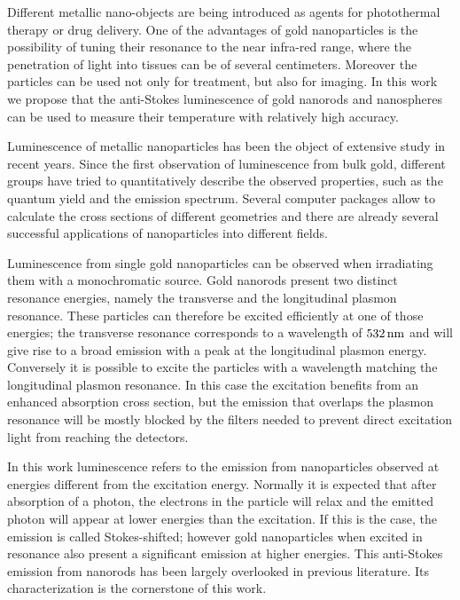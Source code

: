 Different metallic nano-objects are being introduced as agents for photothermal
therapy or drug delivery\cite{Kang2013}. One of the advantages of gold
nanoparticles is the possibility of tuning their resonance to the near infra-red
range, where the penetration of light into tissues can be of several
centimeters\cite{Huang2006,Gobin2007,Hirsch2003,ONeal2004,Li2013c,Huang2008}.
Moreover the particles can be used not only for treatment, but also for
imaging\cite{Zhao2014a,Huang2006}. In this work we propose that the anti-Stokes
luminescence of gold nanorods and nanospheres can be used to measure their
temperature with relatively high accuracy.

Luminescence of metallic nanoparticles has been the object of extensive study in
recent years. Since the first observation of luminescence from bulk
gold\cite{Mooradian1969}, different groups have tried to quantitatively describe
the observed properties\cite{Mohamed2000,Beversluis2003a}, such as the quantum
yield\cite{Fang2012,Rao2015,Yorulmaz2012,Cheng2015,Dulkeith2004} and the
emission spectrum\cite{Link2010}. Several computer
packages\cite{Yurkin2011,Draine1994,Oskooi2010} allow to calculate the cross
sections of different geometries and there are already several successful
applications of nanoparticles into different
fields\cite{Fedoruk2013,Huang2006,Huang2008,Zijlstra2009}.  

Luminescence from single gold nanoparticles can be observed when
irradiating them with a monochromatic source. Gold nanorods present two distinct
resonance energies, namely the transverse and the longitudinal plasmon
resonance. These particles can therefore be excited efficiently at one of those
energies; the transverse resonance corresponds to a wavelength of $532\,\textrm{nm}$ and will give
rise to a broad emission with a peak at the longitudinal plasmon energy.
Conversely it is possible to excite the particles with a wavelength matching
the longitudinal plasmon resonance. In this case the excitation benefits from
an enhanced absorption cross section, but the emission that overlaps the plasmon
resonance will be mostly blocked by the filters needed to prevent direct
excitation light from reaching the detectors.

In this work luminescence refers to the emission from nanoparticles observed at
energies different from the excitation energy. Normally it is expected that
after absorption of a photon, the electrons in the particle will relax and the
emitted photon will appear at lower energies than the excitation. If this is the
case, the emission is called Stokes-shifted; however gold nanoparticles when
excited in resonance also present a significant emission at higher energies.
This anti-Stokes emission from nanorods has been largely overlooked in
previous literature. Its characterization is the cornerstone of this work.


